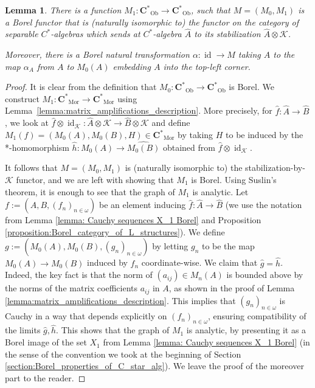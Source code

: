 \documentclass[12pt]{amsart}
\newtheorem{lemma}[theorem]{Lemma}
\DeclareMathOperator{\id}{id}
\DeclareMathOperator{\Mor}{Mor}
\DeclareMathOperator{\Ob}{Ob}
\newcommand{\Cstar}{\mathbf{C^*}} %
\newcommand{\fancyK}{\mathcal{K}}
\begin{document}
\begin{lemma} \label{lemma:stabilization is Borel}
    There is a function $M_1 \colon \Cstar_{\Ob} \to \Cstar_{\Ob}$, such that $M=(M_0,M_1)$ is a Borel functor that is (naturally isomorphic to) the functor on the category of separable $C^*$-algebras which sends at $C^*$-algebra $\widehat{A}$ to its stabilization $\widehat{A} \otimes \mathcal{K}$. 
    
    Moreover, there is a Borel natural transformation $\alpha \colon \id \to M$ taking $A$ to the map $\alpha_A$ from $A$ to $M_0(A)$ embedding $A$ into the top-left corner.
\end{lemma}
\begin{proof}
    It is clear from the definition that $M_0 \colon \Cstar_{\Ob} \to \Cstar_{\Ob}$ is Borel. We construct $M_1 \colon \Cstar_{\Mor} \to \Cstar_{\Mor}$ using Lemma~\ref{lemma:matrix_amplifications_description}. More precisely, for $\widehat{f} \colon \widehat{A} \to \widehat{B}$, we look at $\widehat{f} \otimes \id_{\fancyK} \colon \widehat{A} \otimes \fancyK \to \widehat{B} \otimes \fancyK$ and define $M_1(f)=(M_0(A),M_0(B),H) \in \Cstar_{\Mor}$ by taking $H$ to be induced by the *-homomorphism $\widehat{h} \colon \widehat{M_0(A)} \to \widehat{M_0(B)}$ obtained from $\widehat{f} \otimes \id_{\fancyK}$. 
    
    It follows that $M=(M_0,M_1)$ is (naturally isomorphic to) the stabilization-by-$\mathcal{K}$ functor, and we are left with showing that $M_1$ is Borel. Using Suslin's theorem, it is enough to see that the graph of $M_1$ is analytic. Let $f:=(A,B,(f_n)_{n \in \omega})$ be an element inducing $\widehat{f} \colon \widehat{A} \to \widehat{B}$ (we use the notation from Lemma \ref{lemma: Cauchy sequences X_1 Borel} and Proposition \ref{proposition:Borel_category_of_L_structures}). We define $g:=(M_0(A),M_0(B), (g_n)_{n \in \omega})$ by letting $g_n$ to be the map $M_0(A) \to M_0(B)$ induced by $f_n$ coordinate-wise. We claim that $\widehat{g} = \widehat{h}$. Indeed, the key fact is that the norm of $(a_{ij}) \in M_n(A)$ is bounded above by the norms of the matrix coefficients $a_{ij}$ in $A$, as shown in the proof of Lemma \ref{lemma:matrix_amplifications_description}. This implies that $(g_n)_{n \in \omega}$ is Cauchy in a way that depends explicitly on $(f_n)_{n \in \omega}$, ensuring compatibility of the limits $\widehat{g}, \widehat{h}$. This shows that the graph of $M_1$ is analytic, by presenting it as a Borel image of the set $X_1$ from Lemma \ref{lemma: Cauchy sequences X_1 Borel} (in the sense of the convention we took at the beginning of Section \ref{section:Borel_properties_of_C_star_alg}).
    We leave the proof of the moreover part to the reader.
\end{proof}
\end{document}
